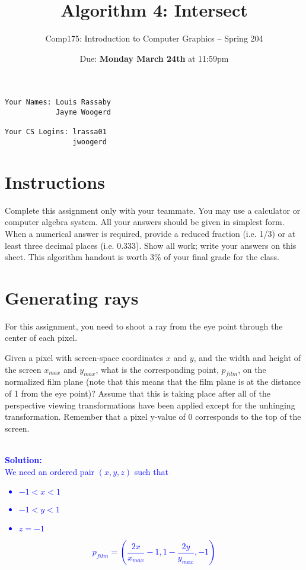 \documentclass[10pt,twocolumn]{article}
\title{\Huge{\bf Algorithm 4: Intersect}}
\author{Comp175: Introduction to Computer Graphics -- Spring 204}
\date{Due:  {\bf Monday March 24th} at 11:59pm}                                           %
\newcommand{\solution}[1]{\textcolor{Blue}{\\{\bf Solution:} \\ #1}}  %
\begin{document}
\maketitle

\begin{verbatim}
Your Names: Louis Rassaby
            Jayme Woogerd

Your CS Logins: lrassa01
                jwoogerd
\end{verbatim}

\section{Instructions}
Complete this assignment only with your teammate. You may use a calculator or computer algebra system. All your answers should be given in simplest form. When a numerical answer is required, provide a reduced fraction (i.e. 1/3) or at least three decimal places (i.e. 0.333). Show all work; write your answers on this sheet. This algorithm handout is worth 3\% of your final grade for the class.

\section{Generating rays}
For this assignment, you need to shoot a ray from the eye point through the center of each pixel.

\begin{framed}
\noindent {\bf [1 point]} Given a pixel with screen-space coordinates $x$ and $y$, and the width and height of the screen $x_{max}$ and $y_{max}$, what is the corresponding point, $p_{film}$, on the normalized film plane (note that this means that the film plane is at the distance of 1 from the eye point)? Assume that this is taking place after all of the perspective viewing transformations have been applied except for the unhinging transformation. Remember that a pixel y-value of 0 corresponds to the top of the screen.\\[5mm]
\solution{
We need an ordered pair $(x, y, z)$ such that
\begin{itemize}
\item $-1 < x < 1$
\item $-1 < y < 1$
\item $z = -1$
\end{itemize}
\[ p_{film} = \left( \frac{2x}{x_{max}} - 1, 1 - \frac{2y}{y_{max}}, -1\right)\]
}
\end{framed}
\end{document}
